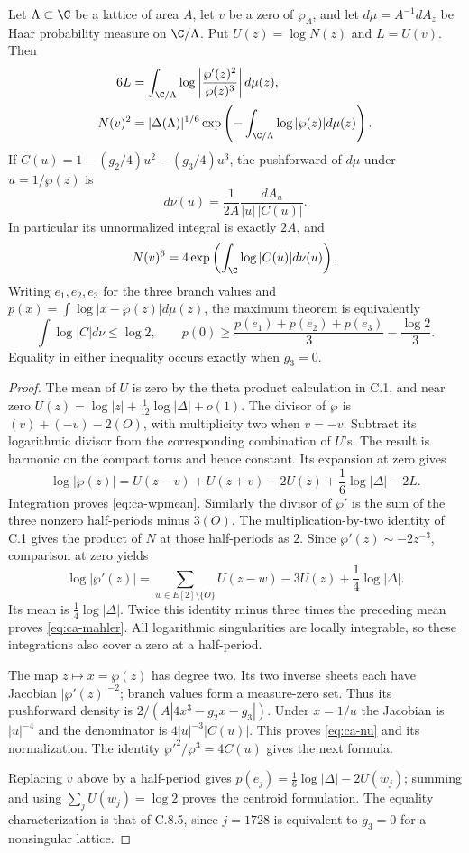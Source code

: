 \begin{statement}
Let $\Lambda\subset\C$ be a lattice of area $A$, let $v$ be a zero
of $\wp_\Lambda$, and let $d\mu=A^{-1}dA_z$ be Haar probability
measure on $\C/\Lambda$. Put $U(z)=\log N(z)$ and
$L=U(v)$. Then
\begin{align}
 6L&=\int_{\C/\Lambda}\log\left|\frac{\wp'(z)^2}{\wp(z)^3}\right|d\mu(z),
 \label{eq:ca-mahler}\\
 N(v)^2&=|\Delta(\Lambda)|^{1/6}
      \exp\left(-\int_{\C/\Lambda}\log|\wp(z)|d\mu(z)\right).
 \label{eq:ca-wpmean}
\end{align}
If $C(u)=1-(g_2/4)u^2-(g_3/4)u^3$, the pushforward of $d\mu$
under $u=1/\wp(z)$ is
\begin{equation}\label{eq:ca-nu}
 d\nu(u)=\frac1{2A}\frac{dA_u}{|u|\,|C(u)|}.
\end{equation}
In particular its unnormalized integral is exactly $2A$, and
\[
 N(v)^6=4\exp\left(\int_{\C}\log|C(u)|d\nu(u)\right).
\]
Writing $e_1,e_2,e_3$ for the three branch values and
$p(x)=\int\log|x-\wp(z)|d\mu(z)$, the maximum theorem is equivalently
\[
 \int\log|C|d\nu\leq\log2,\qquad
 p(0)\geq\frac{p(e_1)+p(e_2)+p(e_3)}3-\frac{\log2}3.
\]
Equality in either inequality occurs exactly when $g_3=0$.
\end{statement}
\begin{proof}
The mean of $U$ is zero by the theta product calculation in C.1,
and near zero
$U(z)=\log|z|+\frac1{12}\log|\Delta|+o(1)$.
The divisor of $\wp$ is $(v)+(-v)-2(O)$, with multiplicity
two when $v=-v$. Subtract its logarithmic divisor from the
corresponding combination of $U$'s. The result is harmonic
on the compact torus and hence constant. Its expansion at
zero gives
\[
 \log|\wp(z)|=U(z-v)+U(z+v)-2U(z)
                  +\frac16\log|\Delta|-2L.
\]
Integration proves \eqref{eq:ca-wpmean}.
Similarly the divisor of $\wp'$ is the sum of the three
nonzero half-periods minus $3(O)$. The multiplication-by-two
identity of C.1 gives the product of $N$ at those half-periods
as $2$. Since $\wp'(z)\sim-2z^{-3}$, comparison at zero yields
\[
 \log|\wp'(z)|=\sum_{w\in E[2]\setminus\{O\}}U(z-w)-3U(z)
                         +\frac14\log|\Delta|.
\]
Its mean is $\frac14\log|\Delta|$. Twice this identity minus
three times the preceding mean proves \eqref{eq:ca-mahler}.
All logarithmic singularities are locally integrable, so these
integrations also cover a zero at a half-period.

The map $z\mapsto x=\wp(z)$ has degree two. Its two inverse
sheets each have Jacobian $|\wp'(z)|^{-2}$; branch values form
a measure-zero set. Thus its pushforward density is
$2/(A|4x^3-g_2x-g_3|)$. Under $x=1/u$ the Jacobian is
$|u|^{-4}$ and the denominator is $4|u|^{-3}|C(u)|$.
This proves \eqref{eq:ca-nu} and its normalization. The identity
$\wp'^2/\wp^3=4C(u)$ gives the next formula.

Replacing $v$ above by a half-period gives
$p(e_j)=\frac16\log|\Delta|-2U(w_j)$; summing and using
$\sum_jU(w_j)=\log2$ proves the centroid formulation.
The equality characterization is that of C.8.5,
since $j=1728$ is equivalent to $g_3=0$ for a nonsingular lattice.
\end{proof}
